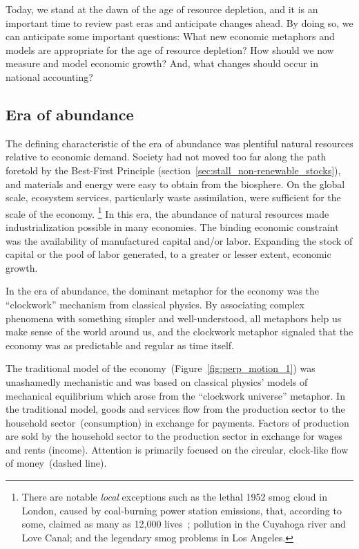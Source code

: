 Today, we stand at the dawn of the age of resource depletion, 
and it is an important time to review past eras
and anticipate changes ahead.
By doing so, we can anticipate some important questions:
What new economic metaphors and models are appropriate for the age of resource depletion?
How should we now measure and model economic growth?
And, what changes should occur in national accounting?


\subsection{Era of abundance}
\label{sec:era_of_abundance}

The defining characteristic of the era of abundance 
was plentiful natural resources relative to economic demand.
Society had not moved too far along the path foretold
by the Best-First Principle (section~\ref{sec:stall_non-renewable_stocks}),
and materials and energy were easy to obtain from the biosphere.
On the global scale, ecosystem services,
particularly waste assimilation,
were sufficient for the scale of the economy.%
	\footnote{
	There are notable \emph{local} exceptions
	such as 
	the lethal 1952 smog cloud in London, 
	caused by coal-burning power station emissions,
	that, according to some, 
	claimed as many as 12,000 lives~\cite{Davis2002,Bell2004};
	pollution in the Cuyahoga river and Love Canal;
	and the legendary smog problems in Los Angeles.
	}
In this era, the abundance of natural resources
made industrialization possible in many economies.
The binding economic constraint was the availability of 
manufactured capital and/or labor.
Expanding the stock of capital or the pool of labor generated, 
to a greater or lesser extent, 
economic growth.

In the era of abundance, 
the dominant metaphor for the economy 
was the ``clockwork'' mechanism from classical physics.
By associating complex phenomena with
something simpler and well-understood,
all metaphors help us make sense of the world around us, and
the clockwork metaphor signaled that the economy 
was as predictable and regular as time itself.

The traditional model of the economy~(Figure~\ref{fig:perp_motion_1})
was unashamedly mechanistic
and was based on classical physics' models 
of mechanical equilibrium which arose from the 
``clockwork universe'' metaphor.\cite{Ingrao1990, Walras1892, Walras1993}
In the traditional model,
goods and services flow from the production sector
to the household sector~(consumption)
in exchange for payments.
Factors of production
are sold by the household sector to the
production sector in exchange for wages and rents (income).
Attention is primarily focused on the circular, clock-like 
flow of money~(dashed line).

